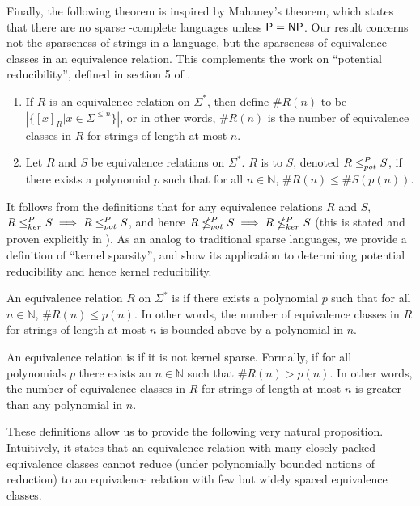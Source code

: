 Finally, the following theorem is inspired by Mahaney's theorem, which states that there are no sparse \NP-complete languages unless ${\mathsf{P}}={\mathsf{NP}}$.
Our result concerns not the sparseness of strings in a language, but the sparseness of equivalence classes in an equivalence relation.
This complements the work on ``potential reducibility'', defined in section 5 of \autocite{bcffm}.

\begin{definition}
  \mbox{}
  \begin{enumerate}
  \item If $R$ is an equivalence relation on $\Sigma^*$, then define $\#R(n)$ to be $\left|\{[x]_R | x \in \Sigma^{\leq n}\}\right|$, or in other words, $\#R(n)$ is the number of equivalence classes in $R$ for strings of length at most $n$.
  \item
    Let $R$ and $S$ be equivalence relations on $\Sigma^*$.
    $R$ is  to $S$, denoted $R\leq^{P}_{pot} S$, if there exists a polynomial $p$ such that for all $n\in\mathbb{N}$, $\#R(n)\leq \#S(p(n))$.
  \end{enumerate}
\end{definition}

It follows from the definitions that for any equivalence relations $R$ and $S$, $R\leq^{P}_{ker} S\implies R\leq^{P}_{pot} S$, and hence $R\nleq^{P}_{pot} S \implies R\nleq^{P}_{ker} S$ (this is stated and proven explicitly in \autocite[Lemma~5.5]{bcffm}).
As an analog to traditional sparse languages, we provide a definition of ``kernel sparsity'', and show its application to determining potential reducibility and hence kernel reducibility.

\begin{definition}
  An equivalence relation $R$ on $\Sigma^*$ is  if there exists a polynomial $p$ such that for all $n\in\mathbb{N}$, $\#R(n)\leq p(n)$.
  In other words, the number of equivalence classes in $R$ for strings of length at most $n$ is bounded above by a polynomial in $n$.

  An equivalence relation is  if it is not kernel sparse.
  Formally, if for all polynomials $p$ there exists an $n\in\mathbb{N}$ such that $\#R(n)>p(n)$.
  In other words, the number of equivalence classes in $R$ for strings of length at most $n$ is greater than any polynomial in $n$.
\end{definition}

These definitions allow us to provide the following very natural proposition.
Intuitively, it states that an equivalence relation with many closely packed equivalence classes cannot reduce (under polynomially bounded notions of reduction) to an equivalence relation with few but widely spaced equivalence classes.

